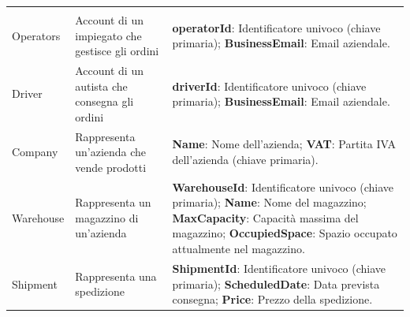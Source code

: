 \begin{tabularx}{\textwidth}{YYY}
\begin{minipage}[c]{\linewidth}
  \end{minipage} \\
  Operators & Account di un impiegato che gestisce gli ordini &
  \begin{minipage}[c]{\linewidth}%
    \vspace{0.45cm}
    \footnotesize
    \textbf{operatorId}:  Identificatore univoco (chiave primaria); \newline
    \textbf{BusinessEmail}: Email aziendale. \newline
  \end{minipage} \\
  Driver & Account di un autista che consegna gli ordini &
  \begin{minipage}[c]{\linewidth}%
    \vspace{0.45cm}
    \footnotesize
    \textbf{driverId}: Identificatore univoco (chiave primaria); \newline
    \textbf{BusinessEmail}: Email aziendale. \newline
  \end{minipage} \\
  Company & Rappresenta un'azienda che vende prodotti &
  \begin{minipage}[c]{\linewidth}%
    \vspace{0.45cm}
    \footnotesize
    \textbf{Name}: Nome dell'azienda; \newline
    \textbf{VAT}: Partita IVA dell'azienda (chiave primaria). \newline
  \end{minipage} \\
  Warehouse & Rappresenta un magazzino di un'azienda &
  \begin{minipage}[c]{\linewidth}%
    \vspace{0.45cm}
    \footnotesize
    \textbf{WarehouseId}:  Identificatore univoco (chiave primaria); \newline
    \textbf{Name}: Nome del magazzino; \newline
    \textbf{MaxCapacity}: Capacità massima del magazzino; \newline
    \textbf{OccupiedSpace}: Spazio occupato attualmente nel magazzino. \newline
  \end{minipage} \\
  Shipment & Rappresenta una spedizione &
  \begin{minipage}[c]{\linewidth}%
    \vspace{0.5cm}
    \footnotesize
    \textbf{ShipmentId}: Identificatore univoco (chiave primaria); \newline
    \textbf{ScheduledDate}: Data prevista consegna; \newline
    \textbf{Price}: Prezzo della spedizione. \newline
  \end{minipage} \\
  \bottomrule
\end{tabularx}

